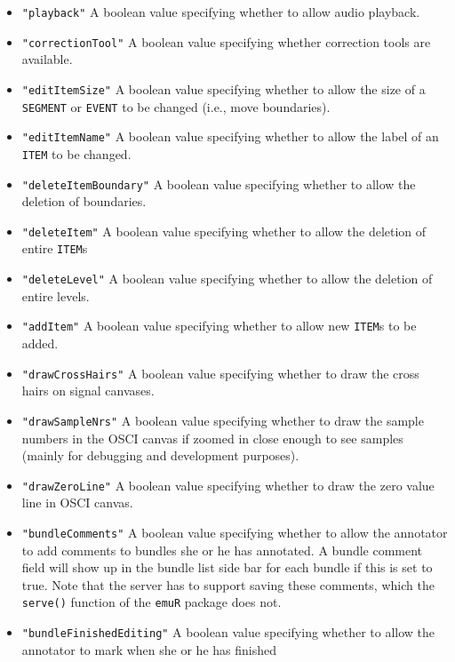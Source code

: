 \documentclass[]{book}
\begin{document}
\begin{itemize}
\begin{itemize}
    \begin{itemize}
    \item
      \texttt{"playback"} A boolean value specifying whether to allow
      audio playback.
    \item
      \texttt{"correctionTool"} A boolean value specifying whether
      correction tools are available.
    \item
      \texttt{"editItemSize"} A boolean value specifying whether to allow
      the size of a \texttt{SEGMENT} or \texttt{EVENT} to be changed (i.e., move
      boundaries).
    \item
      \texttt{"editItemName"} A boolean value specifying whether to allow
      the label of an \texttt{ITEM} to be changed.
    \item
      \texttt{"deleteItemBoundary"} A boolean value specifying whether to
      allow the deletion of boundaries.
    \item
      \texttt{"deleteItem"} A boolean value specifying whether to allow
      the deletion of entire \texttt{ITEM}s
    \item
      \texttt{"deleteLevel"} A boolean value specifying whether to allow
      the deletion of entire levels.
    \item
      \texttt{"addItem"} A boolean value specifying whether to allow new
      \texttt{ITEM}s to be added.
    \item
      \texttt{"drawCrossHairs"} A boolean value specifying whether to
      draw the cross hairs on signal canvases.
    \item
      \texttt{"drawSampleNrs"} A boolean value specifying whether to draw
      the sample numbers in the OSCI canvas if zoomed in close
      enough to see samples (mainly for debugging and development
      purposes).
    \item
      \texttt{"drawZeroLine"} A boolean value specifying whether to draw
      the zero value line in OSCI canvas.
    \item
      \texttt{"bundleComments"} A boolean value specifying whether to
      allow the annotator to add comments to bundles she or he has
      annotated. A bundle comment field will show up in the bundle
      list side bar for each bundle if this is set to true. Note
      that the server has to support saving these comments, which
      the \texttt{serve()} function of the \texttt{emuR} package does not.
    \item
      \texttt{"bundleFinishedEditing"} A boolean value specifying whether
      to allow the annotator to mark when she or he has finished

\end{itemize}
\end{itemize}
\end{itemize}
\end{document}
